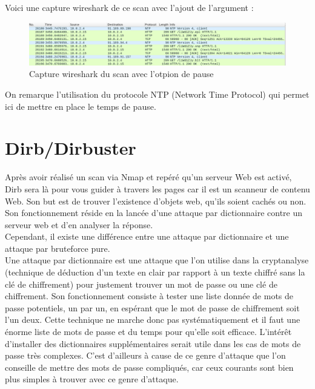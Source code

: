Voici une capture wireshark de ce scan avec l'ajout de l'argument :

\begin{figure}[htp!]
  \centering
  \setlength\figureheight{7cm}
  \setlength\figurewidth{9cm}
  \includegraphics[width=1\textwidth]{oui/Ancien/imangeancien/Nikto/wireshark4.PNG}
  \caption{Capture wireshark du scan avec l'otpion de pause}
  \label{fig:courbe-tikz}
\end{figure}

\noindent On remarque l'utilisation du protocole NTP (Network Time Protocol) qui permet ici de mettre en place le temps de pause.
\newpage

\section{Dirb/Dirbuster}

Après avoir réalisé un scan via Nmap et repéré qu'un serveur Web est activé, Dirb sera là pour vous guider à travers les pages car il est un scanneur de contenu Web. Son but est de trouver l’existence d’objets web, qu’ils soient cachés ou non.
Son fonctionnement réside en la lancée d’une attaque par dictionnaire contre un serveur web et d’en analyser la réponse. \\
Cependant, il existe une différence entre une attaque par dictionnaire et une attaque par bruteforce pure.\\
Une attaque par dictionnaire est une attaque que l’on utilise dans la cryptanalyse (technique de déduction d’un texte en clair par rapport à un texte chiffré sans la clé de chiffrement) pour justement trouver un mot de passe ou une clé de chiffrement. 
Son fonctionnement consiste à tester une liste donnée de mots de passe potentiels, un par un, en espérant que le mot de passe de chiffrement soit l’un deux. 
Cette technique ne marche donc pas systématiquement et il faut une énorme liste de mots de passe et du temps pour qu’elle soit efficace. L'intérêt d'installer des dictionnaires supplémentaires serait utile dans les cas de mots de passe très complexes.
C’est d’ailleurs à cause de ce genre d’attaque que l’on conseille de mettre des mots de passe compliqués, car ceux courants sont bien plus simples à trouver avec ce genre d’attaque. 

